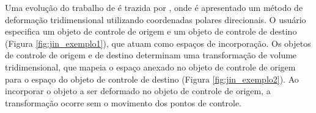 Uma evolução do trabalho de  é trazida por , onde é apresentado um método de deformação tridimensional utilizando coordenadas polares direcionais. O usuário especifica um objeto de controle de origem e um objeto de controle de destino (Figura \ref{fig:jin_exemplo1}), que atuam como espaços de incorporação. Os objetos de controle de origem e de destino determinam uma transformação de volume tridimensional, que mapeia o espaço anexado no objeto de controle de origem para o espaço do objeto de controle de destino (Figura \ref{fig:jin_exemplo2}). Ao incorporar o objeto a ser deformado no objeto de controle de origem, a transformação ocorre sem o movimento dos pontos de controle.

\begin{figure}[h!]
	\centering
	\captionsetup{width=15cm}
	{}	
\end{figure}

\begin{figure}[h!]
	\centering
	\captionsetup{width=15cm}
	{}	
\end{figure}

